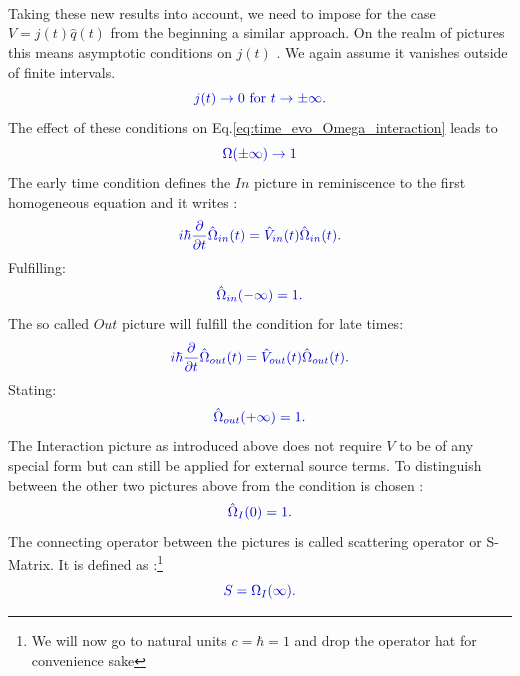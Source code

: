 \documentclass[12pt, titlepage]{article}
\begin{document}
\\\\
%
%
%
%
%
%
\\
Taking these new results into account, we need to impose for the case $  V=j(t)\hat{q}(t) $ from the beginning a similar approach. On the realm of pictures this means asymptotic conditions on $ j(t) $ . We  again assume it vanishes outside of finite intervals. 
\begin{equation}
\textcolor[RGB]{0,0,204}{
j(t)\rightarrow 0 \text{ for } t\rightarrow \pm \infty
}. 
\end{equation}
The effect of these conditions on Eq.\eqref{eq:time_evo_Omega_interaction} leads to 
\begin{equation}
\textcolor[RGB]{0,0,204}{
\Omega(\pm \infty) \rightarrow 1
}
\end{equation}
The early time condition defines the $ In $ picture in reminiscence to the first homogeneous equation and it  writes :
\begin{equation}\label{eq:time_evo_Omega_in}
\textcolor[RGB]{0,0,204}{
	i\hbar
	\frac{\partial}{\partial t}
	\hat{\Omega}_{in}(t)
	=
	\hat{V}_{in}(t)
	\hat{\Omega}_{in}(t)
	.}
\end{equation}
Fulfilling:
\begin{equation}\label{eq:Omega_in_cond}
\textcolor[RGB]{0,0,204}{
	\hat{\Omega}_{in}(-\infty)
	=1
	.}
\end{equation}
The so called $ Out $ picture will fulfill the condition for late times:
\begin{equation}\label{eq:time_evo_Omega_out}
\textcolor[RGB]{0,0,204}{
	i\hbar
	\frac{\partial}{\partial t}
	\hat{\Omega}_{out}(t)
	=
	\hat{V}_{out}(t)
	\hat{\Omega}_{out}(t)
	.}
\end{equation}
Stating:
\begin{equation}\label{eq:Omega_out_cond}
\textcolor[RGB]{0,0,204}{
	\hat{\Omega}_{out}(+\infty)
	=1
	.}
\end{equation}
The Interaction picture as introduced above does not require $ V $ to be of any special form but can still be applied for external source terms. To distinguish between the other two pictures above from the condition is chosen :
\begin{equation}\label{eq:Omega_I_cond}
\textcolor[RGB]{0,0,204}{
	\hat{\Omega}_{I}(0)
	=1
	.}
\end{equation}
The connecting operator between the pictures is called scattering operator or S-Matrix. It is defined as :\footnote{We will now go to natural units $c= \hbar=1 $ and drop the operator hat for convenience sake}
\begin{equation}\label{eq:S_in_out}
\textcolor[RGB]{0,0,204}{
	S
	=\Omega_{I}(\infty)
	.}
\end{equation}
\end{document}

